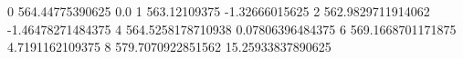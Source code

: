 0 564.44775390625 0.0
1 563.12109375 -1.32666015625
2 562.9829711914062 -1.46478271484375
4 564.5258178710938 0.07806396484375
6 569.1668701171875 4.7191162109375
8 579.7070922851562 15.25933837890625
